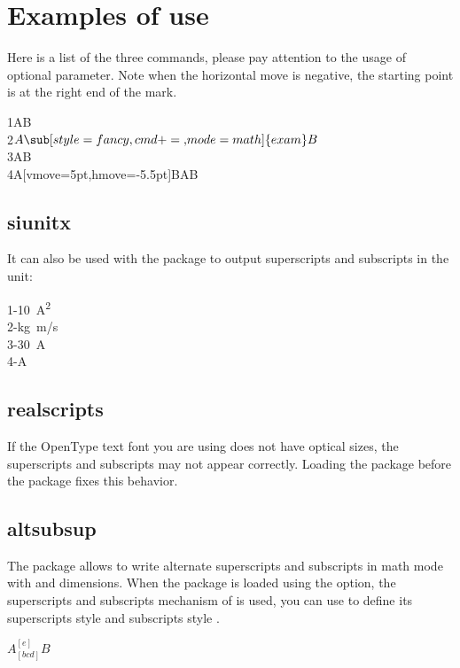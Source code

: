 \documentclass[load-preamble+]{cnltx-doc}
\begin{document}
\section{Examples of use}
Here is a list of the three commands, please pay attention to the usage of optional parameter. Note when the horizontal move is negative, the starting point is at the right end of the mark.
\begin{demohigh}
1AB \\
2$A\sub[style=fancy,cmd+=\mathsf,mode=math]{exam}B$ \\
3AB \\
4A[vmove=5pt,hmove=-5.5pt]BAB
\end{demohigh}

\subsection{siunitx}
It can also be used with the  package to output superscripts and subscripts in the unit:
\begin{demohigh}
1-\qty[mode=text]{10}{A^2} \\
2-\unit[mode=math]{kg.m/s} \\
3-\qty[mode=text]{30}{A} \\
4-\unit[mode=text]{A}
\end{demohigh}

\subsection{realscripts}
If the OpenType text font you are using does not have optical sizes, the superscripts and subscripts may not appear correctly. Loading the  package before the  package fixes this behavior.
\begin{codehigh}
\usepackage{realscripts,spbmark}
\end{codehigh}

\subsection{altsubsup}
The  package allows to write alternate superscripts and subscripts in math mode with \code{\^{}} and \code{\_{}} dimensions. When the package is loaded using the  option, the superscripts and subscripts mechanism of  is used, you can use  to define its superscripts style  and subscripts style .
\begin{demohigh}
$A_[bcd]^[e]B$
\end{demohigh}
\end{document}
